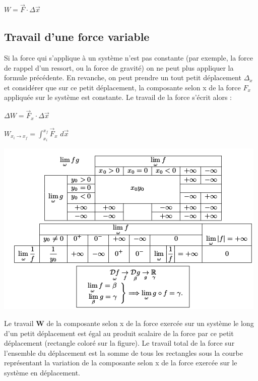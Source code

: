 \documentclass[a4paper,10pt]{book}
\begin{document}
\begin{center} $W=\vec{F}\cdot\Delta\vec{x}$ \end{center}

\subsection{Travail d'une force variable}
Si la force qui s’applique à un système n’est pas constante (par exemple, la force de rappel d’un ressort, ou la force de gravité) on ne peut plus appliquer la formule précédente. En revanche, on peut prendre un tout petit déplacement $\Delta_{x}$ et considérer que sur ce petit déplacement, la composante selon x de la force $F_{x}$ appliquée sur le système est constante. Le travail de la force s’écrit alors :
\begin{center} $\Delta W=\vec{F}_{x}\cdot\Delta \vec{x}$\\ \end{center}

\begin{center} $W_{x_{i}\rightarrow x_{f}}=\displaystyle\int_{x_{i}}^{x_{f}}\vec{F}_{x}$ $d\vec{x}$\\ \end{center}

\begin{center} \includegraphics[scale=0.4]{images/023.png} \end{center}

Le travail \textbf{W} de la composante selon x de la force exercée sur un système le long d’un petit déplacement est égal au produit scalaire de la force par ce petit déplacement (rectangle coloré sur la figure). Le travail total de la force sur l’ensemble du déplacement est la somme de tous les rectangles sous la courbe représentant la variation de la composante selon x de la force exercée sur le système en déplacement.\\
\end{document}
